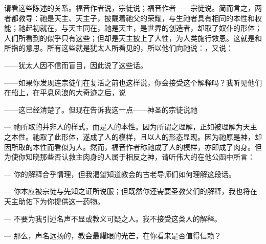 请看这些陈述的关系。福音作者说，宗徒说；福音作者——宗徒说。简而言之，两者都教导：祂是天主、天主子，披戴着祂父的荣耀，与生祂者具有相同的本性和权能；祂起初就在，与天主同在，祂是天主，是世界的创造者，却取了奴仆的形体；人们所看到的似乎只有这些；但却是天主披上了人性，为人类施行救恩。这就是和所指的意思。所有这些就是犹太人所看见的，所以他们向祂说：，又说：\par

——犹太人因不信而盲目，因此说了这些话。\par

——如果你发现连宗徒们在复活之前也这样说，你会接受这个解释吗？我听见他们在船上，在平息风浪的大奇迹之后，说\par

——这已经清楚了。但现在告诉我这一点——神圣的宗徒说祂\par

— 祂所取的并非人的样式，而是人的本性。因为所谓之理解，正如被理解为天主之本性。祂取了此形体，遂成了人的模样，且以人的形态显现。因为祂原是神，却因所取的本性而看似为人。然而，福音作者称祂成了人的模样，亦即成了肉身。但为使你知晓那些否认救主肉身的人属于相反之神，请听伟大的在他公函中所言：\par

— 你的解释合乎情理，但我渴望知道教会的古老导师们如何理解这段话。\par

— 你本应被宗徒与先知之证所说服；但既然你还需要圣教父们的解释，我也将在天主助佑下为你提供这一药物。\par

— 不要为我引述名声不显或教义可疑之人。我不接受这类人的解释。\par

— 那么，声名远扬的，教会最耀眼的光芒，在你看来是否值得信赖？\par

